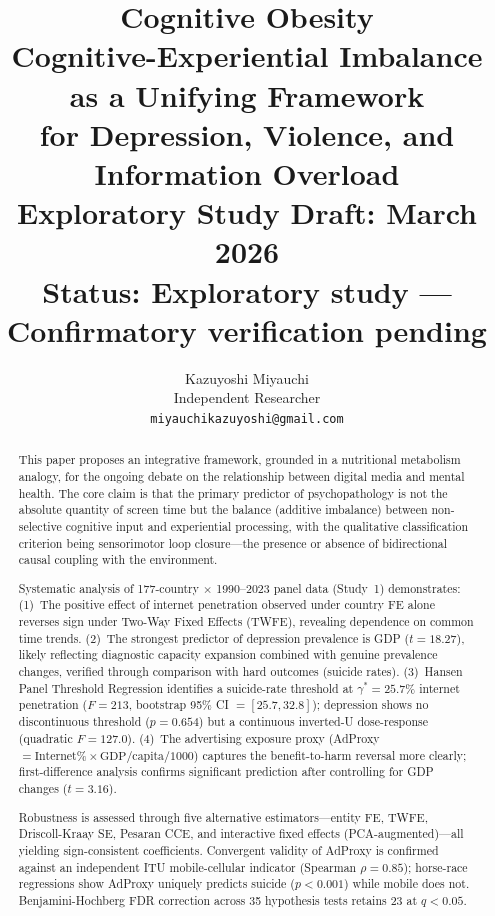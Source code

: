 \documentclass[a4paper,11pt,titlepage]{article}
\title{%
  \vspace{-2cm}
  {\LARGE\bfseries Cognitive Obesity}\\[6pt]
  {\large Cognitive-Experiential Imbalance as a Unifying Framework\\
   for Depression, Violence, and Information Overload}\\[12pt]
  {\small Exploratory Study \quad Draft: March 2026}\\
  {\small\color{red} Status: Exploratory study --- Confirmatory verification pending}
}
\author{Kazuyoshi Miyauchi\\Independent Researcher\\
  \texttt{miyauchikazuyoshi@gmail.com}}
\date{}
\begin{document}
\maketitle
\thispagestyle{empty}

\begin{abstract}
\noindent
This paper proposes an integrative framework, grounded in a nutritional metabolism analogy, for the ongoing debate on the relationship between digital media and mental health.
The core claim is that the primary predictor of psychopathology is not the absolute quantity of screen time but the balance (additive imbalance) between non-selective cognitive input and experiential processing, with the qualitative classification criterion being sensorimotor loop closure---the presence or absence of bidirectional causal coupling with the environment.

Systematic analysis of 177-country $\times$ 1990--2023 panel data (Study~1) demonstrates:
(1)~The positive effect of internet penetration observed under country FE alone reverses sign under Two-Way Fixed Effects (TWFE), revealing dependence on common time trends.
(2)~The strongest predictor of depression prevalence is GDP ($t=18.27$), likely reflecting diagnostic capacity expansion combined with genuine prevalence changes, verified through comparison with hard outcomes (suicide rates).
(3)~Hansen Panel Threshold Regression identifies a suicide-rate threshold at $\gamma^*=25.7\%$ internet penetration ($F=213$, bootstrap 95\% CI $= [25.7, 32.8]$); depression shows no discontinuous threshold ($p=0.654$) but a continuous inverted-U dose-response (quadratic $F=127.0$).
(4)~The advertising exposure proxy (AdProxy $= \text{Internet}\% \times \text{GDP/capita} / 1000$) captures the benefit-to-harm reversal more clearly; first-difference analysis confirms significant prediction after controlling for GDP changes ($t=3.16$).

Robustness is assessed through five alternative estimators---entity FE, TWFE, Driscoll-Kraay SE, Pesaran CCE, and interactive fixed effects (PCA-augmented)---all yielding sign-consistent coefficients.
Convergent validity of AdProxy is confirmed against an independent ITU mobile-cellular indicator (Spearman $\rho=0.85$); horse-race regressions show AdProxy uniquely predicts suicide ($p<0.001$) while mobile does not.
Benjamini-Hochberg FDR correction across 35 hypothesis tests retains 23 at $q<0.05$.


\end{abstract}
\end{document}
